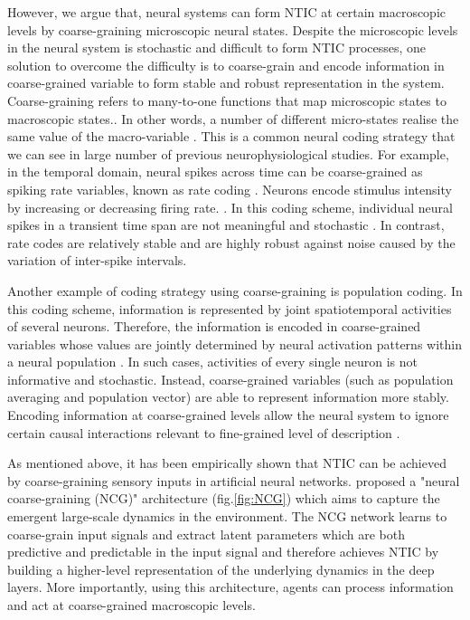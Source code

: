 \documentclass[utf8]{article}
\begin{document}
		However, we argue that, neural systems can form NTIC at certain macroscopic levels by coarse-graining microscopic neural states. Despite the microscopic levels in the neural system is stochastic and difficult to form NTIC processes, one solution to overcome the difficulty is to coarse-grain and encode information in coarse-grained variable to form stable and robust representation in the system. Coarse-graining refers to many-to-one functions that map microscopic states to macroscopic states.. In other words, a number of different micro-states realise the same value of the macro-variable \citep{price2007causation}. This is a common neural coding strategy that we can see in large number of previous neurophysiological studies. For example, in the temporal domain, neural spikes across time can be coarse-grained as spiking rate variables, known as rate coding \citep{adrian1926impulses, gerstner2002spiking, maass2001pulsed, panzeri2015neural, stein2005neuronal}. Neurons encode stimulus intensity by increasing or decreasing firing rate. \citep{kandel2000principles}. In this coding scheme, individual neural spikes in a transient time span are not meaningful and stochastic \citep{stein2005neuronal}. In contrast, rate codes are relatively stable and are highly robust against noise caused by the variation of inter-spike intervals. 
		
		Another example of coding strategy using coarse-graining is population coding. In this coding scheme, information is represented by joint spatiotemporal activities of several neurons. Therefore, the information is encoded in coarse-grained variables whose values are jointly determined by neural activation patterns within a neural population \citep{kristan1997population, pouget2000information, binder2009encyclopedia, QuianQuiroga2009}. In such cases, activities of every single neuron is not informative and stochastic. Instead, coarse-grained variables (such as population averaging and population vector) are able to represent information more stably. Encoding information at coarse-grained levels allow the neural system to ignore certain causal interactions relevant to fine-grained level of description \citep{Woodward2007-WOOCWA}.
			
			
		As mentioned above, it has been empirically shown that NTIC can be achieved by coarse-graining sensory inputs in artificial neural networks. \citep{guttenberg2016neural} proposed a "neural coarse-graining (NCG)" architecture (fig.\ref{fig:NCG}) which aims to capture the emergent large-scale dynamics in the environment. The NCG network learns to coarse-grain input signals and extract latent parameters which are both predictive and predictable in the input signal and therefore achieves NTIC by building a higher-level representation of the underlying dynamics in the deep layers. More importantly, using this architecture, agents can process information and act at coarse-grained macroscopic levels.
		
\end{document}
